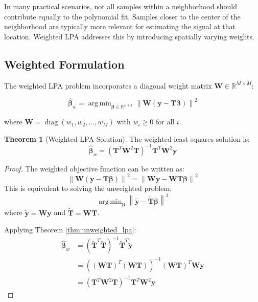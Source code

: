 \documentclass[12pt]{article}
\DeclareMathOperator{\argmin}{arg\,min}
\DeclareMathOperator{\diag}{diag}
\renewcommand{\vec}[1]{\mathbf{#1}}
\newcommand{\mat}[1]{\mathbf{#1}}
\newcommand{\norm}[1]{\left\|#1\right\|}
\newcommand{\R}{\mathbb{R}}
\theoremstyle{definition}
\newtheorem{theorem}{Theorem}[section]
\begin{document}
In many practical scenarios, not all samples within a neighborhood should contribute equally to the polynomial fit. Samples closer to the center of the neighborhood are typically more relevant for estimating the signal at that location. Weighted LPA addresses this by introducing spatially varying weights.

\subsection{Weighted Formulation}
\label{subsec:weighted_form}

The weighted LPA problem incorporates a diagonal weight matrix $\mat{W} \in \R^{M \times M}$:

\begin{equation}
    \label{eq:weighted_objective}
    \hat{\vec{\beta}}_w = \argmin_{\vec{\beta} \in \R^{L+1}} \norm{\mat{W}(\vec{y} - \mat{T}\vec{\beta})}^2
\end{equation}

where $\mat{W} = \diag(w_1, w_2, \ldots, w_M)$ with $w_i \geq 0$ for all $i$.

\begin{theorem}[Weighted LPA Solution]
    \label{thm:weighted_lpa}
    The weighted least squares solution is:
    \begin{equation}
        \label{eq:weighted_solution}
        \hat{\vec{\beta}}_w = (\mat{T}^T\mat{W}^2\mat{T})^{-1}\mat{T}^T\mat{W}^2\vec{y}
    \end{equation}
\end{theorem}

\begin{proof}
    The weighted objective function can be written as:
    \begin{equation}
        \norm{\mat{W}(\vec{y} - \mat{T}\vec{\beta})}^2 = \norm{\mat{W}\vec{y} - \mat{W}\mat{T}\vec{\beta}}^2
    \end{equation}
    This is equivalent to solving the unweighted problem:
    \begin{equation}
        \argmin_{\vec{\beta}} \norm{\tilde{\vec{y}} - \tilde{\mat{T}}\vec{\beta}}^2
    \end{equation}
    where $\tilde{\vec{y}} = \mat{W}\vec{y}$ and $\tilde{\mat{T}} = \mat{W}\mat{T}$.

    Applying Theorem \ref{thm:unweighted_lpa}:
    \begin{align}
        \hat{\vec{\beta}}_w & = (\tilde{\mat{T}}^T\tilde{\mat{T}})^{-1}\tilde{\mat{T}}^T\tilde{\vec{y}}   \\
                            & = ((\mat{W}\mat{T})^T(\mat{W}\mat{T}))^{-1}(\mat{W}\mat{T})^T\mat{W}\vec{y} \\
                            & = (\mat{T}^T\mat{W}^2\mat{T})^{-1}\mat{T}^T\mat{W}^2\vec{y}
    \end{align}
\end{proof}
\end{document}
